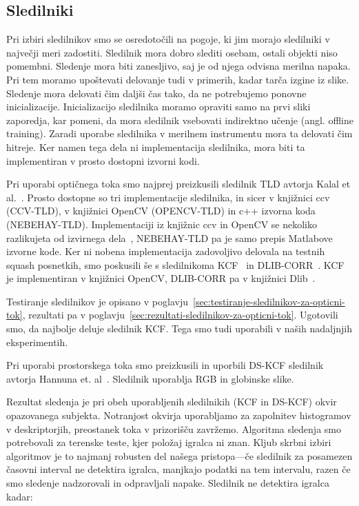 \subsection{Sledilniki}
Pri izbiri sledilnikov smo se osredotočili na pogoje, ki jim morajo sledilniki v največji meri zadostiti. Sledilnik mora dobro slediti osebam, ostali objekti niso pomembni. Sledenje mora biti zanesljivo, saj je od njega odvisna merilna napaka. Pri tem moramo upoštevati delovanje tudi v primerih, kadar tarča izgine iz slike. Sledenje mora delovati čim daljši čas tako, da ne potrebujemo ponovne inicializacije. Inicializacijo sledilnika moramo opraviti samo na prvi sliki zaporedja, kar pomeni, da mora sledilnik vsebovati indirektno učenje (angl. offline training). Zaradi uporabe sledilnika v merilnem instrumentu mora ta delovati čim hitreje. Ker namen tega dela ni implementacija sledilnika, mora biti ta implementiran v prosto dostopni izvorni kodi. 

Pri uporabi optičnega toka smo najprej preizkusili sledilnik TLD avtorja Kalal et al.~\cite{kalal2012tracking}. Prosto dostopne so tri implementacije sledilnika, in sicer v knjižnici ccv (CCV-TLD), v knjižnici OpenCV (OPENCV-TLD) in c++ izvorna koda (NEBEHAY-TLD). Implementaciji iz knjižnic ccv in OpenCV se nekoliko razlikujeta od izvirnega dela~\cite{kalal2012tracking}, NEBEHAY-TLD pa je samo prepis Matlabove izvorne kode.  Ker ni nobena implementacija zadovoljivo delovala na testnih squash posnetkih, smo poskusili še s sledilnikoma KCF~\cite{danelljan2014adaptive} in DLIB-CORR~\cite{danelljan2014accurate}. KCF je implementiran v knjižnici OpenCV, DLIB-CORR pa v knjižnici Dlib~\cite{king2009dlib}.

Testiranje sledilnikov je opisano v poglavju~\ref{sec:testiranje-sledilnikov-za-opticni-tok}, rezultati pa v poglavju~\ref{sec:rezultati-sledilnikov-za-opticni-tok}. Ugotovili smo, da najbolje deluje sledilnik KCF. Tega smo tudi uporabili v naših nadaljnjih eksperimentih.

Pri uporabi prostorskega toka smo preizkusili in uporbili DS-KCF sledilnik avtorja Hannuna et. al~\cite{hannuna2016ds}. Sledilnik uporablja RGB in globinske slike.


Rezultat sledenja je pri obeh uporabljenih sledilnikih (KCF in DS-KCF) okvir opazovanega subjekta. Notranjost okvirja uporabljamo za zapolnitev histogramov v deskriptorjih, preostanek toka v prizorišču zavržemo. Algoritma sledenja smo potrebovali za terenske teste, kjer položaj igralca ni znan. Kljub skrbni izbiri algoritmov je to najmanj robusten del našega pristopa---če sledilnik za posamezen časovni interval ne detektira igralca, manjkajo podatki na tem intervalu, razen če smo sledenje nadzorovali in odpravljali napake. Sledilnik ne detektira igralca kadar:

